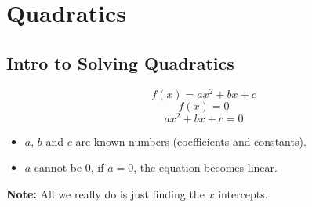 \section{Quadratics}
\subsection{Intro to Solving Quadratics}
\begin{definition}
  $$f(x) = ax^2 + bx + c$$
  $$f(x) = 0$$
  $$ax^2 + bx + c = 0$$
  \begin{itemize}
  \item $a, \, b$ and $c$ are known numbers (coefficients and constants).
  \item $a$ cannot be 0, if $a = 0$, the equation becomes linear.
  \end{itemize}
  \textbf{Note: }All we really do is just finding the $x$ intercepts.
\end{definition}
